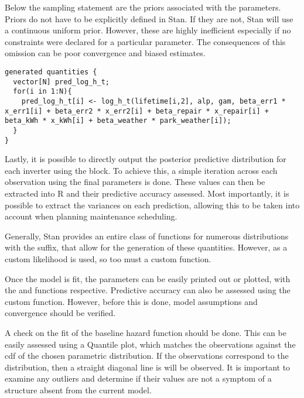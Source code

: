 Below the sampling statement are the priors associated with the parameters. Priors do not have to be explicitly defined in Stan. If they are not, Stan will use a continuous uniform prior. However, these are highly inefficient especially if no constraints were declared for a particular parameter. The consequences of this omission can be poor convergence and biased estimates. 



\begin{lstlisting}
generated quantities {
  vector[N] pred_log_h_t;
  for(i in 1:N){
    pred_log_h_t[i] <- log_h_t(lifetime[i,2], alp, gam, beta_err1 * x_err1[i] + beta_err2 * x_err2[i] + beta_repair * x_repair[i] + beta_kWh * x_kWh[i] + beta_weather * park_weather[i]);
  }
}
\end{lstlisting}

Lastly, it is possible to directly output the posterior predictive distribution for each inverter using the  block. To achieve this, a simple iteration across each observation using the final parameters is done. These values can then be extracted into R and their predictive accuracy assessed. Most importantly, it is possible to extract the variances on each prediction, allowing this to be taken into account when planning maintenance scheduling. 

Generally, Stan provides an entire class of functions for numerous distributions with the suffix,  that allow for the generation of these quantities. However, as a custom likelihood is used, so too must a custom function.

Once the model is fit, the parameters can be easily printed out or plotted, with the  and  functions respective. Predictive accuracy can also be assessed using the custom  function. However, before this is done, model assumptions and convergence should be verified. 


A check on the fit of the baseline hazard function should be done. This can be easily assessed using a Quantile plot, which matches the observations against the cdf of the chosen parametric distribution. If the observations correspond to the distribution, then a straight diagonal line is will be observed. It is important to examine any outliers and determine if their values are not a symptom of a structure absent from the current model. 

